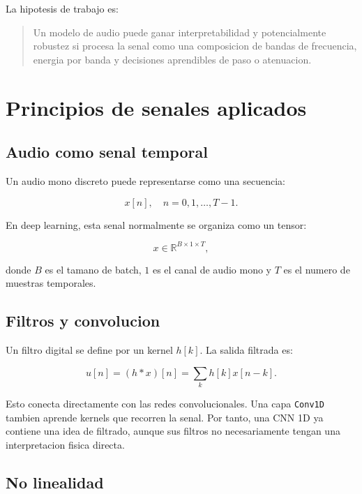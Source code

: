 \documentclass[11pt,letterpaper]{article}
\begin{document}
La hipotesis de trabajo es:

\begin{quote}
Un modelo de audio puede ganar interpretabilidad y potencialmente robustez si
procesa la senal como una composicion de bandas de frecuencia, energia por
banda y decisiones aprendibles de paso o atenuacion.
\end{quote}

\section{Principios de senales aplicados}

\subsection{Audio como senal temporal}

Un audio mono discreto puede representarse como una secuencia:

\begin{equation}
    x[n], \quad n = 0,1,\ldots,T-1.
\end{equation}

En deep learning, esta senal normalmente se organiza como un tensor:

\begin{equation}
    x \in \mathbb{R}^{B \times 1 \times T},
\end{equation}

donde $B$ es el tamano de batch, $1$ es el canal de audio mono y $T$ es el
numero de muestras temporales.

\subsection{Filtros y convolucion}

Un filtro digital se define por un kernel $h[k]$. La salida filtrada es:

\begin{equation}
    u[n] = (h * x)[n] = \sum_k h[k]x[n-k].
\end{equation}

Esto conecta directamente con las redes convolucionales. Una capa
\texttt{Conv1D} tambien aprende kernels que recorren la senal. Por tanto, una
CNN 1D ya contiene una idea de filtrado, aunque sus filtros no necesariamente
tengan una interpretacion fisica directa.

\subsection{No linealidad}
\end{document}
